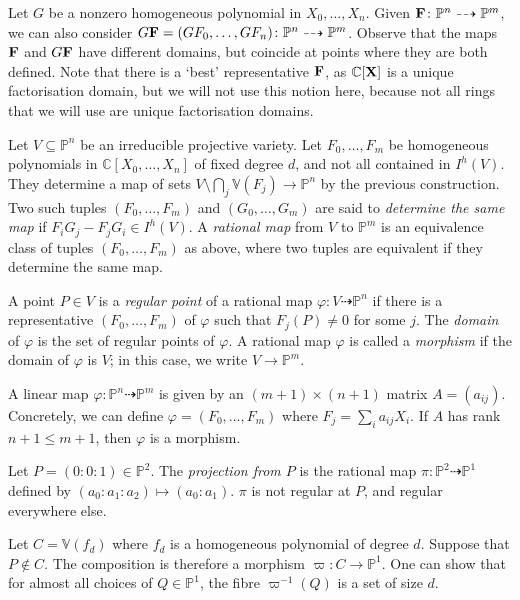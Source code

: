 Let \( G \) be a nonzero homogeneous polynomial in \( X_0, \dots, X_n \).
Given \( \vb F \colon \mathbb P^n \dashrightarrow \mathbb P^m \), we can also consider \( G\vb F = (GF_0, \dots, GF_n) \colon \mathbb P^n \dashrightarrow \mathbb P^m \).
Observe that the maps \( \vb F \) and \( G\vb F \) have different domains, but coincide at points where they are both defined.
Note that there is a `best' representative \( \vb F \), as \( \mathbb C[\vb X] \) is a unique factorisation domain, but we will not use this notion here, because not all rings that we will use are unique factorisation domains.
\begin{definition}
    Let \( V \subseteq \mathbb P^n \) be an irreducible projective variety.
    Let \( F_0, \dots, F_m \) be homogeneous polynomials in \( \mathbb C[X_0, \dots, X_n] \) of fixed degree \( d \), and not all contained in \( I^h(V) \).
    They determine a map of sets \( V \setminus \bigcap_j \mathbb V(F_j) \to \mathbb P^n \) by the previous construction.
    Two such tuples \( (F_0, \dots, F_m) \) and \( (G_0, \dots, G_m) \) are said to \emph{determine the same map} if \( F_i G_j - F_j G_i \in I^h(V) \).
    A \emph{rational map} from \( V \) to \( \mathbb P^m \) is an equivalence class of tuples \( (F_0, \dots, F_m) \) as above, where two tuples are equivalent if they determine the same map.
\end{definition}
\begin{definition}
    A point \( P \in V \) is a \emph{regular point} of a rational map \( \varphi \colon V \dashrightarrow \mathbb P^n \) if there is a representative \( (F_0, \dots, F_m) \) of \( \varphi \) such that \( F_j(P) \neq 0 \) for some \( j \).
    The \emph{domain} of \( \varphi \) is the set of regular points of \( \varphi \).
    A rational map \( \varphi \) is called a \emph{morphism} if the domain of \( \varphi \) is \( V \); in this case, we write \( V \to \mathbb P^m \).
\end{definition}
\begin{example}
    A linear map \( \varphi \colon \mathbb P^n \dashrightarrow \mathbb P^m \) is given by an \( (m + 1) \times (n + 1) \) matrix \( A = (a_{ij}) \).
    Concretely, we can define \( \varphi = (F_0, \dots, F_m) \) where \( F_j = \sum_i a_{ij} X_i \).
    If \( A \) has rank \( n + 1 \leq m + 1 \), then \( \varphi \) is a morphism.
\end{example}
\begin{example}
    Let \( P = (0 : 0 : 1) \in \mathbb P^2 \).
    The \emph{projection from \( P \)} is the rational map \( \pi \colon \mathbb P^2 \dashrightarrow \mathbb P^1 \) defined by \( (a_0 : a_1 : a_2) \mapsto (a_0 : a_1) \).
    \( \pi \) is not regular at \( P \), and regular everywhere else.
    
    Let \( C = \mathbb V(f_d) \) where \( f_d \) is a homogeneous polynomial of degree \( d \).
    Suppose that \( P \not\in C \).
    The composition is therefore a morphism \( \varpi \colon C \to \mathbb P^1 \).
    One can show that for almost all choices of \( Q \in \mathbb P^1 \), the fibre \( \varpi^{-1}(Q) \) is a set of size \( d \).
\end{example}
